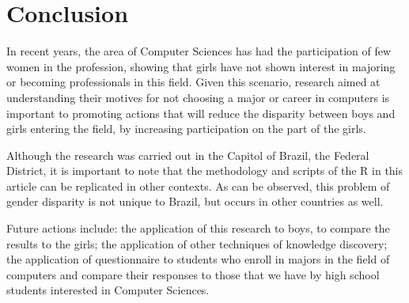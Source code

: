 \section{Conclusion}\label{sec:conclusion}%

In recent years, the area of Computer Sciences has had the participation of few women in the profession, showing that girls have not shown interest in majoring or becoming professionals in this field. Given this scenario, research aimed at understanding their motives for not choosing a major or career in computers is important to promoting actions that will reduce the disparity between boys and girls entering the field, by increasing participation on the part of the girls. 

Although the research was carried out in the Capitol of Brazil, the Federal District, it is important to note that the methodology and scripts of the R in this article can be replicated in other contexts. As can be observed, this problem of gender disparity is not unique to Brazil, but occurs in other countries as well. 

Future actions include: the application of this research to boys, to compare the results to the girls; the application of other techniques of knowledge discovery; the application of questionnaire to students who enroll in majors in the field of computers and compare their responses to those that we have by high school students interested in Computer Sciences.  
